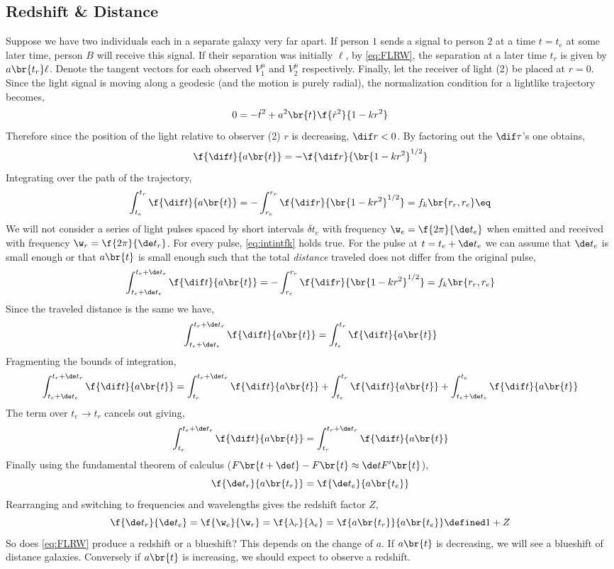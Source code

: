 \documentclass{article}
\begin{document}
\subsection{Redshift \& Distance}
Suppose we have two individuals each in a separate galaxy very far apart. If person $1$ sends a signal to person $2$ at a time $t = t_e$ at some later time, person $B$ will receive this signal. If their separation was initially $\ell$, by \eqref{eq:FLRW}, the separation at a later time $t_r$ is given by $a\br{t_r} \ell$. Denote the tangent vectors for each observed $V^\mu_1$ and $V^\mu_2$ respectively. Finally, let the receiver of light (2) be placed at $r=0$. Since the light signal is moving along a geodesic (and the motion is purely radial), the normalization condition for a lightlike trajectory becomes,
\[ 0 = - \dot{t}^2 + a^2\br{t} \f{\dot{r}^2}{1 - kr^2} \]
Therefore since the position of the light relative to observer (2) $r$ is decreasing, $\dif r < 0$. By factoring out the $\dif \tau$'s one obtains,
\[ \f{\dif t}{a\br{t}} = - \f{\dif r}{\br{1-kr^2}^{1/2}} \]
Integrating over the path of the trajectory,
\[ \int_{t_e}^{t_r} \f{\dif t}{a\br{t}} = - \int_{r_e}^{r_r} \f{\dif r}{\br{1-kr^2}^{1/2}} = f_k \br{r_r, r_e} \eq \label{eq:intintfk}\]
We will not consider a series of light pulses spaced by short intervals $\delta t_e$ with frequency $\w_e = \f{2 \pi }{\de t_e}$ when emitted and received with frequency $\w_r = \f{2 \pi }{\de t_r}$. For every pulse, \eqref{eq:intintfk} holds true. For the pulse at $t = t_e + \de t_e$ we can assume that $\de t_e$ is small enough or that $a\br{t}$ is small enough such that the total \textit{distance} traveled does not differ from the original pulse,
\[ \int_{t_e + \de t_e}^{t_r + \de t_r} \f{\dif t}{a\br{t}} = - \int_{r_e}^{r_r} \f{\dif r}{\br{1-kr^2}^{1/2}} = f_k \br{r_r, r_e} \]
Since the traveled distance is the same we have,
\[ \int_{t_e + \de t_e}^{t_r + \de t_r} \f{\dif t}{a\br{t}} = \int_{t_e}^{t_r} \f{\dif t}{a\br{t}} \]
Fragmenting the bounds of integration,
\[ \int_{t_e + \de t_e}^{t_r + \de t_r} \f{\dif t}{a\br{t}} = \int_{t_r}^{t_r + \de t_r} \f{\dif t}{a\br{t}} + \int_{t_e}^{t_r} \f{\dif t}{a\br{t}} + \int_{t_e + \de t_e}^{t_e} \f{\dif t}{a\br{t}} \]
The term over $t_e \to t_r$ cancels out giving,
\[ \int_{t_e}^{t_e + \de t_e} \f{\dif t}{a\br{t}} = \int_{t_r }^{t_r + \de t_r} \f{\dif t}{a\br{t}} \]
Finally using the fundamental theorem of calculus ($F\br{t + \de t} - F\br{t} \approx \de t F'\br{t}$),
\[ \f{\de t_r}{a\br{t_r}} = \f{\de t_e}{a\br{t_e}} \]
Rearranging and switching to frequencies and wavelengths gives the redshift factor $Z$,
\[ \f{\de t_r}{\de t_e} = \f{\w_e}{\w_r} = \f{\lambda_r}{\lambda_e} = \f{a\br{t_r}}{a\br{t_e}} \defined 1 + Z \]
So does \eqref{eq:FLRW} produce a redshift or a blueshift? This depends on the change of $a$. If $a\br{t}$ is decreasing, we will see a blueshift of distance galaxies. Conversely if $a\br{t}$ is increasing, we should expect to observe a redshift. \\
\end{document}
